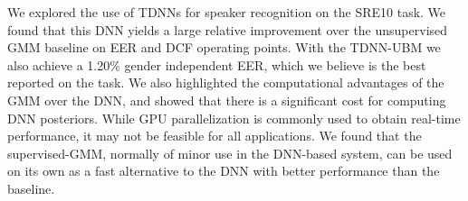 \documentclass{article}
\begin{document}
We explored the use of TDNNs for speaker recognition on the SRE10 task.
We found that this DNN yields a large relative improvement over the
unsupervised GMM baseline on EER and DCF operating points. With the
TDNN-UBM we also achieve a 1.20\% gender independent EER, 
which we believe is the best
reported on the task. We also highlighted the computational advantages
of the GMM over the DNN, and showed that there is a significant cost for
computing DNN posteriors. While GPU parallelization is commonly used to
obtain real-time performance, it may not be feasible for all applications.
We found that the supervised-GMM, normally
of minor use in the DNN-based system, can be 
used on its own as a fast alternative to the DNN with better performance
than the baseline. 



\end{document}
